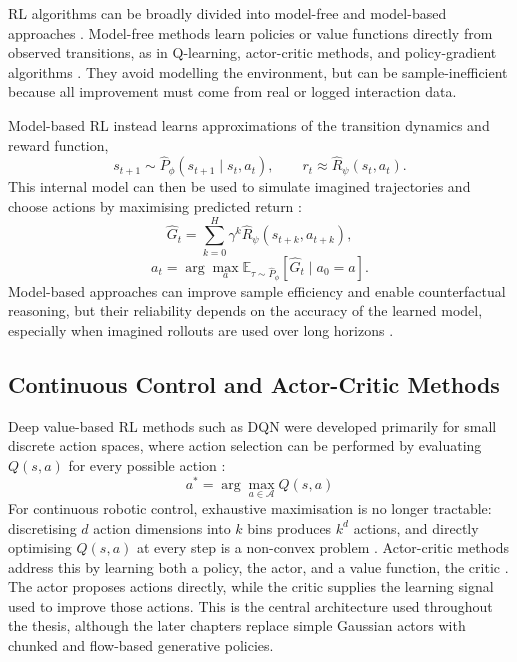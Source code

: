 RL algorithms can be broadly divided into model-free and model-based
approaches \cite{sutton2018reinforcement,moerland2022modelbasedreinforcementlearningsurvey}.
Model-free methods learn policies or value functions directly from
observed transitions, as in Q-learning, actor-critic methods, and
policy-gradient algorithms
\cite{watkins1992qlearning,Williams1992SimpleSG,konda1999actor}. They
avoid modelling the environment, but can be sample-inefficient because
all improvement must come from real or logged interaction data.

Model-based RL instead learns approximations of the transition dynamics
and reward function,
\[
s_{t+1} \sim \hat{P}_\phi(s_{t+1} \mid s_t, a_t), \qquad r_t \approx \hat{R}_\psi(s_t, a_t).
\]
This internal model can then be used to simulate imagined trajectories
and choose actions by maximising predicted return
\cite{dyna,deisenrothpilco}:
\[
\hat{G}_t = \sum_{k=0}^{H} \gamma^k \hat{R}_\psi(s_{t+k}, a_{t+k}),
\]
\[
a_t = \arg\max_a \mathbb{E}_{\tau \sim \hat{P}_\phi}[\hat{G}_t \mid a_0 = a].
\]
Model-based approaches can improve sample efficiency and enable
counterfactual reasoning, but their reliability depends on the accuracy
of the learned model, especially when imagined rollouts are used over
long horizons \cite{daw2011model,moerland2022modelbasedreinforcementlearningsurvey}.

\subsection{Continuous Control and Actor-Critic Methods}

Deep value-based RL methods such as DQN were developed primarily for
small discrete action spaces, where action selection can be performed by
evaluating $Q(s,a)$ for every possible action
\cite{mnih2013playingatarideepreinforcement,mnih2015humanlevel}:
\begin{equation}
    a^* = \arg\max_{a \in \mathcal{A}} Q(s,a)
\end{equation}
For continuous robotic control, exhaustive maximisation is no longer
tractable: discretising $d$ action dimensions into $k$ bins produces
$k^d$ actions, and directly optimising $Q(s,a)$ at every step is a
non-convex problem
\cite{lillicrap2019continuouscontroldeepreinforcement}. Actor-critic
methods address this by learning both a policy, the actor, and a value
function, the critic \cite{konda1999actor}. The actor proposes actions
directly, while the critic supplies the learning signal used to improve
those actions. This is the central architecture used throughout the
thesis, although the later chapters replace simple Gaussian actors with
chunked and flow-based generative policies.

